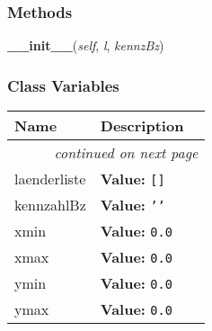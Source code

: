 
  \subsubsection{Methods}

    \label{Karte:Karte:__init__}

    \vspace{0.5ex}

\hspace{.8\funcindent}\begin{boxedminipage}{\funcwidth}

    \raggedright \textbf{\_\_init\_\_}(\textit{self}, \textit{l}, \textit{kennzBz})

\setlength{\parskip}{2ex}
\setlength{\parskip}{1ex}
    \end{boxedminipage}



  \subsubsection{Class Variables}

    \vspace{-1cm}
\hspace{\varindent}\begin{longtable}{|p{\varnamewidth}|p{\vardescrwidth}|l}
\cline{1-2}
\cline{1-2} \centering \textbf{Name} & \centering \textbf{Description}& \\
\cline{1-2}
\endhead\cline{1-2}\multicolumn{3}{r}{\small\textit{continued on next page}}\\\endfoot\cline{1-2}
\endlastfoot\raggedright l\-a\-e\-n\-d\-e\-r\-l\-i\-s\-t\-e\- & \raggedright \textbf{Value:} 
{\tt \texttt{[}\texttt{]}}&\\
\cline{1-2}
\raggedright k\-e\-n\-n\-z\-a\-h\-l\-B\-z\- & \raggedright \textbf{Value:} 
{\tt \texttt{'}\texttt{}\texttt{'}}&\\
\cline{1-2}
\raggedright x\-m\-i\-n\- & \raggedright \textbf{Value:} 
{\tt 0.0}&\\
\cline{1-2}
\raggedright x\-m\-a\-x\- & \raggedright \textbf{Value:} 
{\tt 0.0}&\\
\cline{1-2}
\raggedright y\-m\-i\-n\- & \raggedright \textbf{Value:} 
{\tt 0.0}&\\
\cline{1-2}
\raggedright y\-m\-a\-x\- & \raggedright \textbf{Value:} 
{\tt 0.0}&\\
\cline{1-2}
\end{longtable}

